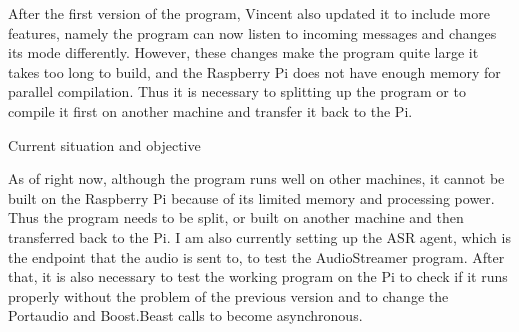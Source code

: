 After the first version of the program, Vincent also updated it to include more
features, namely the program can now listen to incoming messages and changes
its mode differently. However, these changes make the program quite large it
takes too long to build, and the Raspberry Pi does not have enough memory for
parallel compilation. Thus it is necessary to splitting up the program or to
compile it first on another machine and transfer it back to the Pi.

Current situation and objective

As of right now, although the program runs well on other machines, it cannot be
built on the Raspberry Pi because of its limited memory and processing power.
Thus the program needs to be split, or built on another machine and then
transferred back to the Pi. I am also currently setting up the ASR agent, which
is the endpoint that the audio is sent to, to test the AudioStreamer program.
After that, it is also necessary to test the working program on the Pi to check
if it runs properly without the problem of the previous version and to change
the Portaudio and Boost.Beast calls to become asynchronous.
